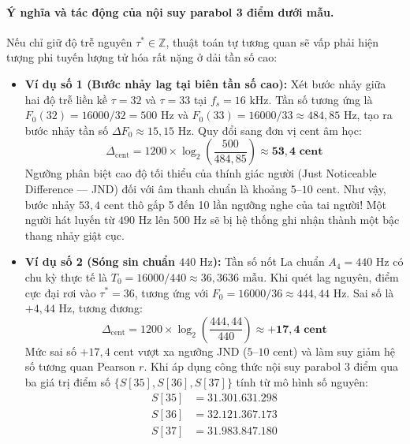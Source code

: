\documentclass[11pt,a4paper]{article}
\begin{document}
\paragraph{Ý nghĩa và tác động của nội suy parabol 3 điểm dưới mẫu.}
Nếu chỉ giữ độ trễ nguyên $\tau^* \in \mathbb{Z}$, thuật toán tự tương quan sẽ vấp phải hiện tượng phi tuyến lượng tử hóa rất nặng ở dải tần số cao:
\begin{itemize}
    \setlength{\itemsep}{1.5pt}
    \item \textbf{Ví dụ số 1 (Bước nhảy lag tại biên tần số cao):} Xét bước nhảy giữa hai độ trễ liền kề $\tau = 32$ và $\tau = 33$ tại $f_s = 16\text{ kHz}$. Tần số tương ứng là $F_0(32) = 16000/32 = 500\text{ Hz}$ và $F_0(33) = 16000/33 \approx 484{,}85\text{ Hz}$, tạo ra bước nhảy tần số $\Delta F_0 \approx 15{,}15\text{ Hz}$. Quy đổi sang đơn vị cent âm học:
    \begin{equation}
    \Delta_{\text{cent}} = 1200 \times \log_2\left(\frac{500}{484{,}85}\right) \approx \mathbf{53{,}4\text{ cent}}
    \end{equation}
    Ngưỡng phân biệt cao độ tối thiểu của thính giác người (Just Noticeable Difference --- JND) đối với âm thanh chuẩn là khoảng $5\text{--}10\text{ cent}$. Như vậy, bước nhảy $53{,}4\text{ cent}$ thô gấp 5 đến 10 lần ngưỡng nghe của tai người! Một người hát luyến từ $490\text{ Hz}$ lên $500\text{ Hz}$ sẽ bị hệ thống ghi nhận thành một bậc thang nhảy giật cục.
    \item \textbf{Ví dụ số 2 (Sóng sin chuẩn $440\text{ Hz}$):} Tần số nốt La chuẩn $A_4 = 440\text{ Hz}$ có chu kỳ thực tế là $T_0 = 16000 / 440 \approx 36{,}3636\text{ mẫu}$. Khi quét lag nguyên, điểm cực đại rơi vào $\tau^* = 36$, tương ứng với $F_0 = 16000 / 36 \approx 444{,}44\text{ Hz}$. Sai số là $+4{,}44\text{ Hz}$, tương đương:
    \begin{equation}
    \Delta_{\text{cent}} = 1200 \times \log_2\left(\frac{444{,}44}{440}\right) \approx \mathbf{+17{,}4\text{ cent}}
    \end{equation}
    Mức sai số $+17{,}4\text{ cent}$ vượt xa ngưỡng JND ($5\text{--}10\text{ cent}$) và làm suy giảm hệ số tương quan Pearson $r$. Khi áp dụng công thức nội suy parabol 3 điểm qua ba giá trị điểm số $\{S[35], S[36], S[37]\}$ tính từ mô hình số nguyên:
    \begin{align*}
    S[35] &= 31.301.631.298 \\
    S[36] &= 32.121.367.173 \\
    S[37] &= 31.983.847.180
    \end{align*}

\end{itemize}
\end{document}
